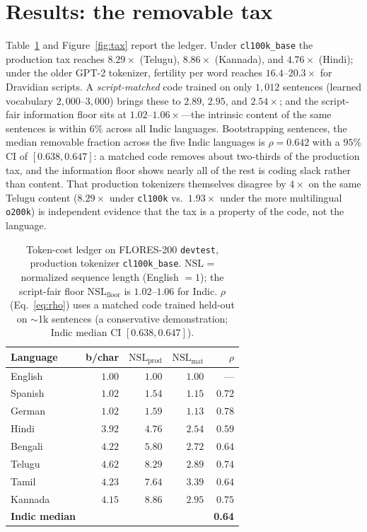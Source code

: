 \documentclass[11pt]{article}
\begin{document}
\section{Results: the removable tax}\label{sec:results}
Table~\ref{tab:ledger} and Figure~\ref{fig:tax} report the ledger. Under \texttt{cl100k\_base} the
production tax reaches $8.29\times$ (Telugu), $8.86\times$ (Kannada), and $4.76\times$ (Hindi); under the
older GPT-2 tokenizer, fertility per word reaches $16.4$--$20.3\times$ for Dravidian scripts. A
\emph{script-matched} code trained on only $1{,}012$ sentences (learned vocabulary $2{,}000$--$3{,}000$)
brings these to $2.89$, $2.95$, and $2.54\times$; and the script-fair information floor sits at
$1.02$--$1.06\times$---the intrinsic content of the same sentences is within $6\%$ across all Indic
languages. Bootstrapping sentences, the median removable fraction across the five Indic languages is
$\rho=0.642$ with a $95\%$ CI of $[0.638,0.647]$: a matched code removes about two-thirds of the
production tax, and the information floor shows nearly all of the rest is coding slack rather than
content. That production tokenizers themselves disagree by $4\times$ on the same Telugu content
($8.29\times$ under \texttt{cl100k} vs.\ $1.93\times$ under the more multilingual \texttt{o200k}) is
independent evidence that the tax is a property of the code, not the language.

\begin{table}[t]\centering\small
\begin{tabular}{lrrrr}
\toprule
Language & b/char & $\mathrm{NSL}_{\mathrm{prod}}$ & $\mathrm{NSL}_{\mathrm{mat}}$ & $\rho$ \\
\midrule
English & $1.00$ & $1.00$ & $1.00$ & --- \\
Spanish & $1.02$ & $1.54$ & $1.15$ & $0.72$ \\
German  & $1.02$ & $1.59$ & $1.13$ & $0.78$ \\
Hindi   & $3.92$ & $4.76$ & $2.54$ & $0.59$ \\
Bengali & $4.22$ & $5.80$ & $2.72$ & $0.64$ \\
Telugu  & $4.62$ & $8.29$ & $2.89$ & $0.74$ \\
Tamil   & $4.23$ & $7.64$ & $3.39$ & $0.64$ \\
Kannada & $4.15$ & $8.86$ & $2.95$ & $0.75$ \\
\midrule
\textbf{Indic median} & & & & \textbf{0.64} \\
\bottomrule
\end{tabular}
\caption{Token-cost ledger on FLORES-200 \texttt{devtest}, production tokenizer \texttt{cl100k\_base}.
$\mathrm{NSL}$ = normalized sequence length (English $=1$); the script-fair floor
$\mathrm{NSL}_{\mathrm{floor}}$ is $1.02$--$1.06$ for Indic. $\rho$ (Eq.~\ref{eq:rho}) uses a matched
code trained held-out on $\sim$1k sentences (a conservative demonstration; Indic median CI
$[0.638,0.647]$).}
\label{tab:ledger}
\end{table}
\end{document}
